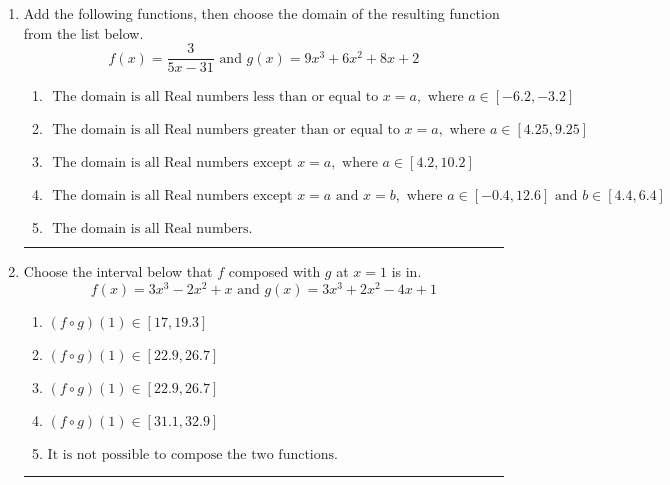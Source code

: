 \documentclass[14pt]{extbook}
\newcommand{\litem}[1]{\item#1\hspace*{-1cm}\rule{\textwidth}{0.4pt}}
\begin{document}
\begin{enumerate}
{\begin{enumerate}[label=\Alph*.]
\end{enumerate} }
\litem{
Add the following functions, then choose the domain of the resulting function from the list below.\[ f(x) = \frac{3}{5x-31} \text{ and } g(x) = 9x^{3} +6 x^{2} +8 x + 2 \]\begin{enumerate}[label=\Alph*.]
\item \( \text{ The domain is all Real numbers less than or equal to } x = a, \text{ where } a \in [-6.2, -3.2] \)
\item \( \text{ The domain is all Real numbers greater than or equal to } x = a, \text{ where } a \in [4.25, 9.25] \)
\item \( \text{ The domain is all Real numbers except } x = a, \text{ where } a \in [4.2, 10.2] \)
\item \( \text{ The domain is all Real numbers except } x = a \text{ and } x = b, \text{ where } a \in [-0.4, 12.6] \text{ and } b \in [4.4, 6.4] \)
\item \( \text{ The domain is all Real numbers. } \)

\end{enumerate} }
\litem{
Choose the interval below that $f$ composed with $g$ at $x=1$ is in.\[ f(x) = 3x^{3} -2 x^{2} +x \text{ and } g(x) = 3x^{3} +2 x^{2} -4 x + 1 \]\begin{enumerate}[label=\Alph*.]
\item \( (f \circ g)(1) \in [17, 19.3] \)
\item \( (f \circ g)(1) \in [22.9, 26.7] \)
\item \( (f \circ g)(1) \in [22.9, 26.7] \)
\item \( (f \circ g)(1) \in [31.1, 32.9] \)
\item \( \text{It is not possible to compose the two functions.} \)

\end{enumerate} }
\end{enumerate}
\end{document}
